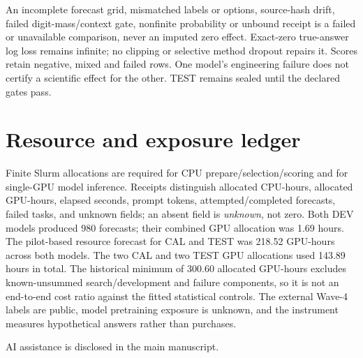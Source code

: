 \documentclass[10pt]{article}
\begin{document}
An incomplete forecast grid, mismatched labels or options,
source-hash drift, failed digit-mass/context gate, nonfinite probability or
unbound receipt is a failed or unavailable comparison, never an imputed
zero effect. Exact-zero true-answer log loss remains infinite; no clipping
or selective method dropout repairs it. Scores retain negative, mixed and
failed rows. One model's engineering failure does not certify a scientific
effect for the other. TEST remains sealed until the declared gates pass.

\section{Resource and exposure ledger}
\label{sec:cost}
Finite Slurm allocations are required for CPU prepare/selection/scoring and
for single-GPU model inference. Receipts distinguish allocated CPU-hours,
allocated GPU-hours, elapsed seconds, prompt tokens, attempted/completed
forecasts, failed tasks, and unknown fields; an absent field is \emph{unknown},
not zero. Both DEV models produced 980 forecasts; their combined GPU
allocation was 1.69 hours. The pilot-based resource forecast for CAL and
TEST was 218.52 GPU-hours across both models. The two CAL and two TEST GPU allocations used 143.89 hours in total. The historical minimum of 300.60
allocated GPU-hours excludes known-unsummed search/development and failure
components, so it is not an end-to-end cost ratio against the fitted
statistical controls. The external Wave-4 labels are public, model
pretraining exposure is unknown, and the instrument measures hypothetical
answers rather than purchases.

AI assistance is disclosed in the main manuscript.
\end{document}
